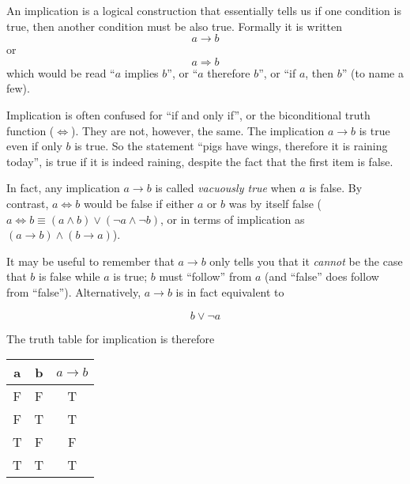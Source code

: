 \documentclass[12pt]{article}
\begin{document}
An implication is a logical construction that essentially tells us if one condition is true, then another condition must be also true.  Formally it is written $$ a \rightarrow b $$ or $$a \Rightarrow b$$ which would be read ``$a$ implies $b$'', or ``$a$ therefore $b$'', or ``if $a$, then $b$'' (to name a few).

Implication is often confused for ``if and only if'', or the biconditional truth function ($\Leftrightarrow$).  They are not, however, the same.  The implication $a \rightarrow b$ is true even if only $b$ is true.  So the statement ``pigs have wings, therefore it is raining today'', is true if it is indeed raining, despite the fact that the first item is false.

In fact, any implication $a \rightarrow b$ is called \emph{vacuously true} when $a$ is false.  By contrast, $a \Leftrightarrow b$ would be false if either $a$ or $b$ was by itself false ($a \Leftrightarrow b \equiv (a \land b) \lor (\lnot a \land \lnot b)$, or in terms of implication as $(a \rightarrow b) \land (b \rightarrow a)$).

It may be useful to remember that $a \rightarrow b$ only tells you that it \emph{cannot} be the case that $b$ is false while $a$ is true; $b$ must ``follow'' from $a$ (and ``false'' does follow from ``false'').  Alternatively, $a \rightarrow b$ is in fact equivalent to 

$$ b \lor \lnot a $$

The truth table for implication is therefore

\begin{center}
\begin{tabular}{ccc}
a & b & $a \rightarrow b$ \\
\hline
F & F & T \\
F & T & T \\
T & F & F \\
T & T & T \\
\end{tabular}
\end{center}
\end{document}
